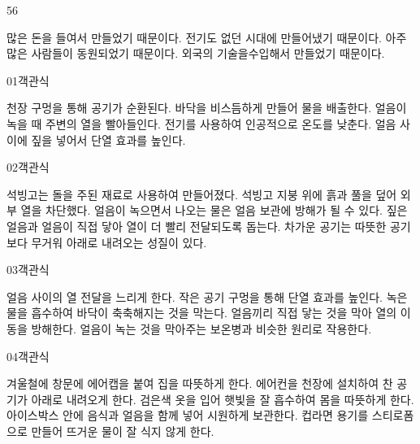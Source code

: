 \documentclass[fs9,seriesFre]{korfarm-base}
\begin{document}
\begin{kfSentenceUnit}{56}{}
\begin{kfChoices}
\kfChoice 많은 돈을 들여서 만들었기 때문이다.
\kfChoice 전기도 없던 시대에 만들어냈기 때문이다.
\kfChoice 아주 많은 사람들이 동원되었기 때문이다.
\kfChoice 외국의 기술을수입해서 만들었기 때문이다.
\end{kfChoices}
\end{kfSentenceUnit}

\kfEndMC


\par\medskip
\kfBeginMC
\begin{kfQBlock}{01}{객관식}
\begin{kfChoices}
\kfChoice 천장 구멍을 통해 공기가 순환된다.
\kfChoice 바닥을 비스듬하게 만들어 물을 배출한다.
\kfChoice 얼음이 녹을 때 주변의 열을 빨아들인다.
\kfChoice 전기를 사용하여 인공적으로 온도를 낮춘다.
\kfChoice 얼음 사이에 짚을 넣어서 단열 효과를 높인다.
\end{kfChoices}
\end{kfQBlock}
\begin{kfQBlock}{02}{객관식}
\begin{kfChoices}
\kfChoice 석빙고는 돌을 주된 재료로 사용하여 만들어졌다.
\kfChoice 석빙고 지붕 위에 흙과 풀을 덮어 외부 열을 차단했다.
\kfChoice 얼음이 녹으면서 나오는 물은 얼음 보관에 방해가 될 수 있다.
\kfChoice 짚은 얼음과 얼음이 직접 닿아 열이 더 빨리 전달되도록 돕는다.
\kfChoice 차가운 공기는 따뜻한 공기보다 무거워 아래로 내려오는 성질이 있다.
\end{kfChoices}
\end{kfQBlock}
\begin{kfQBlock}{03}{객관식}
\begin{kfChoices}
\kfChoice 얼음 사이의 열 전달을 느리게 한다.
\kfChoice 작은 공기 구멍을 통해 단열 효과를 높인다.
\kfChoice 녹은 물을 흡수하여 바닥이 축축해지는 것을 막는다.
\kfChoice 얼음끼리 직접 닿는 것을 막아 열의 이동을 방해한다.
\kfChoice 얼음이 녹는 것을 막아주는 보온병과 비슷한 원리로 작용한다.
\end{kfChoices}
\end{kfQBlock}
\begin{kfQBlock}{04}{객관식}
\begin{kfChoices}
\kfChoice 겨울철에 창문에 에어캡을 붙여 집을 따뜻하게 한다.
\kfChoice 에어컨을 천장에 설치하여 찬 공기가 아래로 내려오게 한다.
\kfChoice 검은색 옷을 입어 햇빛을 잘 흡수하여 몸을 따뜻하게 한다.
\kfChoice 아이스박스 안에 음식과 얼음을 함께 넣어 시원하게 보관한다.
\kfChoice 컵라면 용기를 스티로폼으로 만들어 뜨거운 물이 잘 식지 않게 한다.
\end{kfChoices}
\end{kfQBlock}
\end{document}
